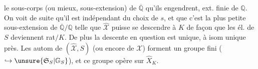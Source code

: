 le sous-corps (ou mieux, sous-extension) de $\overline{\mathbb Q}$ qu'ils engendrent, ext. finie de $\mathbb Q$. On voit de suite qu'il est indépendant du choix de $s$, et que c'est la plus petite sous-extension de $\overline{\mathbb Q}/\mathbb Q$ telle que $\widehat{\mathcal X}$ puisse se descendre  à $K$ de façon que les él. de $S$ deviennent rat$/K$.
De plus la descente en question est unique, à isom unique près. Les autom  de $(\widehat{\mathcal X},S)$ (ou encore de $\mathcal X$) forment un groupe fini ($\hookrightarrow\unsure{\mathfrak S_S|\mathbb G_S}$), et ce groupe opère  sur $\widehat X_K$.
